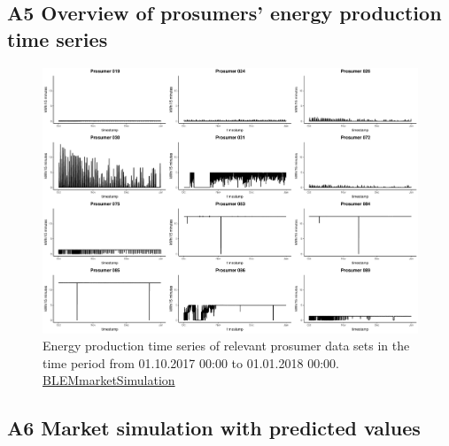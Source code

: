 \subsection*{\hypertarget{AppA5:Figures:producer_all}{A5} Overview of prosumers' energy production time series}\label{AppA5:Figures:producer_all}

\begin{figure}[H]
    \centering
    \includegraphics[width=\textwidth]{thesis/graphs/marketsimulation/producers_all.pdf}
    \caption[Energy production time series of relevant prosumer data sets]{Energy production time series of relevant prosumer data sets in the time period from 01.10.2017 00:00 to 01.01.2018 00:00. \quantnet\href{https://github.com/QuantLet/BLEM/tree/master/BLEMmarketSimulation}{BLEMmarketSimulation}}
\end{figure}


\newpage
\subsection*{\hypertarget{AppA6:Figures:marketsimulation_pred}{A6} Market simulation with predicted values}\label{AppA6:Figures:marketsimulation_pred}

